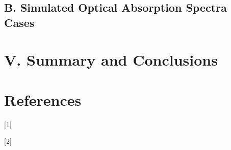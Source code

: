 \documentclass[11pt]{article}
\begin{document}


\subsection*{B.	Simulated Optical Absorption Spectra Cases}









\section*{V.	Summary and Conclusions} %


\pagebreak
\section*{References}
[1]

[2]


\pagebreak
\end{document}
